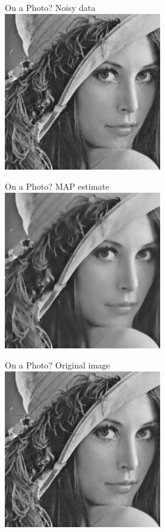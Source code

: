 \documentclass[10pt]{beamer}
\begin{document}
\begin{frame}{On a Photo?}
\centering
Noisy data
\\
\includegraphics[height=40ex]{results/lena-tmp} 
\end{frame}
\begin{frame}{On a Photo?}
\centering
MAP estimate\vphantom{y}
\\
\includegraphics[height=40ex]{results/lena-fixed}
\end{frame}
\begin{frame}{On a Photo?}
\centering
Original image
\\
\includegraphics[height=40ex]{results/lena} 
\end{frame}
\end{document}
